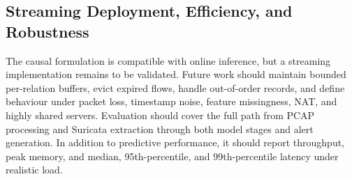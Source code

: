 \documentclass[11pt,fleqn]{report}
\begin{document}
\subsection{Streaming Deployment, Efficiency, and Robustness}
\label{subsubsec:future_streaming_deployment}

The causal formulation is compatible with online inference, but a streaming implementation remains to be validated. Future work should maintain bounded per-relation buffers, evict expired flows, handle out-of-order records, and define behaviour under packet loss, timestamp noise, feature missingness, NAT, and highly shared servers. Evaluation should cover the full path from PCAP processing and Suricata extraction through both model stages and alert generation. In addition to predictive performance, it should report throughput, peak memory, and median, 95th-percentile, and 99th-percentile latency under realistic load.



\end{document}
